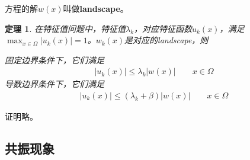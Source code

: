 \documentclass[12pt,a4paper]{article}
\newtheorem{theorem}{定理}
\begin{document}
方程的解$w(x)$叫做\textbf{landscape}。

\begin{theorem}

在特征值问题中，特征值$\lambda_k$，对应特征函数$u_k(x)$，满足$\max_{x \in \Omega} |u_k(x)| = 1$。$w_k(x)$是对应的landscape，则

固定边界条件下，它们满足
\begin{align}
|u_k(x)| \leq \lambda_k |w(x)| \qquad x \in \Omega
\end{align}
导数边界条件下，它们满足
\begin{align}
|u_k(x)| \leq (\lambda_k + \beta) |w(x)| \qquad x \in \Omega
\end{align}

\end{theorem}

证明略。

\subsection{共振现象}
\end{document}
